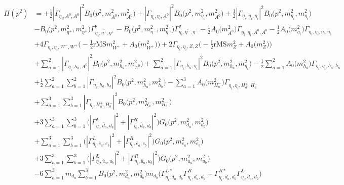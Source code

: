 \begin{itemize}
\begin{align} 
\Pi(p^2) &= +\frac{1}{2} |{\Gamma_{\eta_i,A^0,A^0}}|^2 {B_0\Big(p^{2},m^2_{A^0},m^2_{A^0}\Big)} +|{\Gamma_{\eta_i,\eta_i,A^0}}|^2 {B_0\Big(p^{2},m^2_{\eta_i},m^2_{A^0}\Big)} +\frac{1}{2} |{\Gamma_{\eta_i,\eta_i,\eta_i}}|^2 {B_0\Big(p^{2},m^2_{\eta_i},m^2_{\eta_i}\Big)} \nonumber \\ 
 &- {B_0\Big(p^{2},m^2_{\eta^+},m^2_{\eta^+}\Big)} \Gamma_{\eta_i,\bar{\eta^+},\eta^+}^{2} - {B_0\Big(p^{2},m^2_{\eta^-},m^2_{\eta^-}\Big)} \Gamma_{\eta_i,\bar{\eta^-},\eta^-}^{2} -\frac{1}{2} {A_0\Big(m^2_{A^0}\Big)} {\Gamma_{\eta_i,\eta_i,A^0,A^0}} -\frac{1}{2} {A_0\Big(m^2_{\eta_i}\Big)} {\Gamma_{\eta_i,\eta_i,\eta_i,\eta_i}} \nonumber \\ 
 &+4 {\Gamma_{\eta_i,\eta_i,W^-,W^+}} \Big(-\frac{1}{2} \text{rMS} m^2_{W^+}  + {A_0\Big(m^2_{W^+}\Big)}\Big)+2 {\Gamma_{\eta_i,\eta_i,Z,Z}} \Big(-\frac{1}{2} \text{rMS} m^2_{Z}  + {A_0\Big(m^2_{Z}\Big)}\Big)\nonumber \\ 
 &+\sum_{a=1}^{2}|{\Gamma_{\eta_i,h_{{a}},A^0}}|^2 {B_0\Big(p^{2},m^2_{h_{{a}}},m^2_{A^0}\Big)} +\sum_{a=1}^{2}|{\Gamma_{\eta_i,h_{{a}},\eta_i}}|^2 {B_0\Big(p^{2},m^2_{h_{{a}}},m^2_{\eta_i}\Big)} -\frac{1}{2} \sum_{a=1}^{2}{A_0\Big(m^2_{h_{{a}}}\Big)} {\Gamma_{\eta_i,\eta_i,h_{{a}},h_{{a}}}}  \nonumber \\ 
 &+\frac{1}{2} \sum_{a=1}^{2}\sum_{b=1}^{2}|{\Gamma_{\eta_i,h_{{a}},h_{{b}}}}|^2 {B_0\Big(p^{2},m^2_{h_{{a}}},m^2_{h_{{b}}}\Big)}  - \sum_{a=1}^{3}{A_0\Big(m^2_{H^-_{{a}}}\Big)} {\Gamma_{\eta_i,\eta_i,H^+_{{a}},H^-_{{a}}}}  \nonumber \\ 
 &+\sum_{a=1}^{3}\sum_{b=1}^{3}|{\Gamma_{\eta_i,H^+_{{a}},H^-_{{b}}}}|^2 {B_0\Big(p^{2},m^2_{H^-_{{a}}},m^2_{H^-_{{b}}}\Big)} \nonumber \\ 
 &+3 \sum_{a=1}^{3}\sum_{b=1}^{3}\Big(|{\Gamma^L_{\eta_i,\bar{d}_{{a}},d_{{b}}}}|^2 + |{\Gamma^R_{\eta_i,\bar{d}_{{a}},d_{{b}}}}|^2\Big){G_0\Big(p^{2},m^2_{d_{{a}}},m^2_{d_{{b}}}\Big)}  \nonumber \\ 
 &+\sum_{a=1}^{3}\sum_{b=1}^{3}\Big(|{\Gamma^L_{\eta_i,\bar{e}_{{a}},e_{{b}}}}|^2 + |{\Gamma^R_{\eta_i,\bar{e}_{{a}},e_{{b}}}}|^2\Big){G_0\Big(p^{2},m^2_{e_{{a}}},m^2_{e_{{b}}}\Big)} \nonumber \\ 
 &+3 \sum_{a=1}^{3}\sum_{b=1}^{3}\Big(|{\Gamma^L_{\eta_i,\bar{u}_{{a}},u_{{b}}}}|^2 + |{\Gamma^R_{\eta_i,\bar{u}_{{a}},u_{{b}}}}|^2\Big){G_0\Big(p^{2},m^2_{u_{{a}}},m^2_{u_{{b}}}\Big)}  \nonumber \\ 
 &-6 \sum_{a=1}^{3}m_{d_{{a}}} \sum_{b=1}^{3}{B_0\Big(p^{2},m^2_{d_{{a}}},m^2_{d_{{b}}}\Big)} m_{d_{{b}}} \Big({\Gamma^{L*}_{\eta_i,\bar{d}_{{a}},d_{{b}}}} {\Gamma^R_{\eta_i,\bar{d}_{{a}},d_{{b}}}}  + {\Gamma^{R*}_{\eta_i,\bar{d}_{{a}},d_{{b}}}} {\Gamma^L_{\eta_i,\bar{d}_{{a}},d_{{b}}}} \Big)  \nonumber \\ 

\end{align}
\end{itemize}

